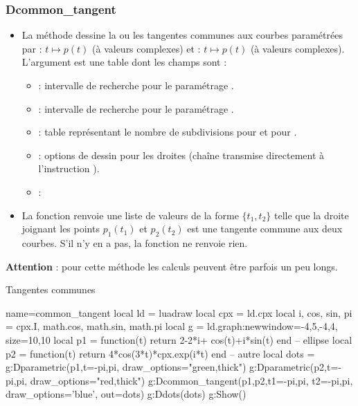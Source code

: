 \subsubsection{Dcommon\_tangent}
\begin{itemize}
    \item La méthode  dessine la ou les tangentes communes aux courbes paramétrées par : \(t \mapsto p(t)\) (à valeurs complexes) et : \(t \mapsto p(t)\) (à valeurs complexes). L'argument  est une table dont les champs sont :
    \begin{itemize}
        \item {} : intervalle de recherche pour le paramétrage .
        \item {} : intervalle de recherche pour le paramétrage .
        \item {} : table représentant  le nombre de subdivisions pour  et pour .
        \item {} : options de dessin pour les droites (chaîne transmise directement à l'instruction \drawcmd).
        \item {} : \arguScale
    \end{itemize}

    \item La fonction  renvoie une liste de valeurs de la forme $\{t_1,t_2\}$ telle que la droite joignant les points $p_1(t_1)$ et $p_2(t_2)$ est une tangente commune aux deux courbes. S'il n'y en a pas, la fonction ne renvoie rien.
\end{itemize}
\textbf{Attention} : pour cette méthode les calculs peuvent être parfois un peu longs.

\begin{demo}{Tangentes communes}
\begin{luadraw}{name=common_tangent}
local ld = luadraw
local cpx = ld.cpx
local i, cos, sin, pi = cpx.I, math.cos, math.sin, math.pi
local g = ld.graph:new{window={-4,5,-4,4}, size={10,10}}
local p1 = function(t) return  2-2*i+ cos(t)+i*sin(t) end -- ellipse
local p2 = function(t) return 4*cos(3*t)*cpx.exp(i*t) end -- autre
local dots = {}
g:Dparametric(p1,{t={-pi,pi}, draw_options="green,thick"})
g:Dparametric(p2,{t={-pi,pi}, draw_options="red,thick"})
g:Dcommon_tangent(p1,p2,{t1={-pi,pi}, t2={-pi,pi}, draw_options='blue', out=dots})
g:Ddots(dots)
g:Show()
\end{luadraw}
\end{demo}

